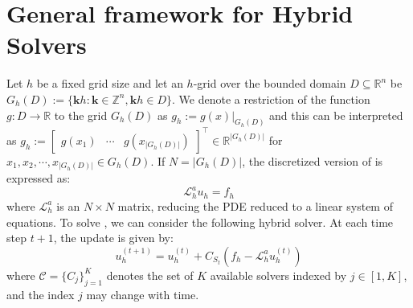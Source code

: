 \documentclass[12pt]{article}
\begin{document}






\section{General framework for Hybrid Solvers}


Let $h$ be a fixed grid size and let an $h$-grid over the bounded domain $D \subseteq \mathbb{R}^n$  be $G_h(D) := \{\mathbf{k}h : \mathbf{k} \in \mathbb{Z}^n, \mathbf{k}h \in D\}$. We denote a restriction of the function $g: D \to \mathbb{R}$ to the grid $G_h(D)$ as $g_h := g(x) \Big\vert_{G_h(D)}$ and this can be interpreted as $g_h := \begin{bmatrix}
    g(x_1) & \cdots & g(x_{|G_h(D)|})
\end{bmatrix}^{\top} \in \mathbb{R}^{|G_h(D)|}$ for $x_1, x_2, \cdots, x_{|G_h(D)|} \in G_h(D)$. If $N = |G_h(D)|$, the discretized version of  is expressed as:
\begin{equation} \label{eq:mainpdediscrete}
    \mathcal{L}_h^au_h = f_h
\end{equation}
where $\mathcal{L}_h^a$ is an $N \times N$ matrix, reducing the PDE reduced to a linear system of equations. To solve , we can consider the following hybrid solver. At each time step $t + 1$, the update is given by:
\begin{equation}
     u^{\left(t + 1\right)}_h = u^{\left(t\right)}_h + C_{S_t}\left(f_h - \mathcal{L}_h^au^{\left(t \right)}_h\right)
\end{equation}
where $\mathcal{C} =\{C_{j}\}_{j = 1}^K$ denotes the set of $K$ available solvers indexed by $j \in [1, K]$, and the index $j$ may change with time. 
\end{document}
